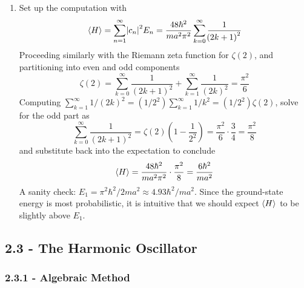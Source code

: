 \documentclass[a4paper]{article}
\begin{document}
\begin{enumerate}[label=(\alph*)]
\[	\]
	So it is overwhelmingly probabilistic that the energy is measured to be in the ground state.
	\item Set up the computation with
	\[
		\braket{H} = \sum^{\infty}_{n=1} \abs{c_{n}}^{2}E_{n} = \frac{48 \hbar^{2}}{ma^{2}\pi^{2}}\sum^{\infty}_{k=0} \frac{1}{\!\left( 2k + 1 \right)^{2}}
	\]
	Proceeding similarly with the Riemann zeta function for \( \zeta \!\left( 2 \right) \), and partitioning into even and odd components
	\[
		\zeta \!\left( 2 \right) = \sum^{\infty}_{k=0} \frac{1}{\!\left( 2k + 1 \right)^{2}} + \sum^{\infty}_{k=1} \frac{1}{\!\left( 2k \right)^{2}} = \frac{\pi^{2}}{6} 
	\]
	Computing \( \sum^{\infty}_{k=1} 1 / \!\left( 2k \right)^{2} = \!\left( 1 / 2^{2} \right)\sum^{\infty}_{k=1} 1 / k^{2} = \!\left( 1 / 2^{2} \right)\zeta \!\left( 2 \right) \), solve for the odd part as 
	\[
		\sum^{\infty}_{k=0} \frac{1}{\!\left( 2k + 1 \right)^{2}} = \zeta \!\left( 2 \right)\!\left( 1 - \frac{1}{2^{2}} \right) = \frac{\pi^{2}}{6} \cdot \frac{3}{4} = \frac{\pi^{2}}{8} 
	\]
	and substitute back into the expectation to conclude
	\[
		\braket{H} = \frac{48 \hbar^{2}}{ma^{2}\pi^{2}} \cdot \frac{\pi^{2}}{8} = \frac{6 \hbar^{2}}{ma^{2}} 
	\]
	A sanity check: \( E_{1} = \pi^{2}\hbar^{2} / 2ma^{2} \approx 4.93 \hbar^{2} / ma^{2} \). Since the ground-state energy is most probabilistic, it is intuitive that we should expect \( \braket{H} \) to be slightly above \( E_{1} \).
\end{enumerate}

\newpage
\subsection{\textsf{2.3 - The Harmonic Oscillator}}
\subsubsection{\textsf{2.3.1 - Algebraic Method}}

\end{document}
